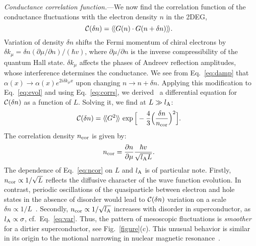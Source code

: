 \documentclass[reprint,
superscriptaddress,
amsmath,
amssymb,
aps,
prl,
floatfix,
english
]{revtex4-2}
\newcommand{\lprox}{L}
\newcommand{\lA}{l_{\rm A}}
\newcommand{\rngl}{\rangle\hspace{-0.05cm}\rangle}
\newcommand{\lngl}{\langle\hspace{-0.05cm}\langle}
\begin{document}
\textit{Conductance correlation function.}---We now find the correlation function of the conductance fluctuations with the electron density $n$ in the 2DEG,
\begin{equation}\label{eq:corrdef}
    {\cal C}(\delta n) = \lngl G(n) \cdot G(n + \delta n)\rngl.
\end{equation}
Variation of density $\delta n$ shifts the Fermi momentum of chiral electrons by $\delta k_\mu = \delta n (\partial \mu / \partial n) / (\hbar v)$, where $\partial \mu / \partial n$ is the inverse compressibility of the quantum Hall state.
$\delta k_\mu$ affects the phases of Andreev reflection amplitudes, whose interference determines the conductance.
We see from Eq.~\eqref{eq:damp} that $\alpha(x) \rightarrow \alpha(x) e^{2i\delta k_\mu x}$ upon changing $n \rightarrow n + \delta n$.
Applying this modification to Eq.~\eqref{eq:evol} and using Eq.~\eqref{eq:corrs}, we derived~\cite{sm} a differential equation for ${\cal C}(\delta n)$ as a function of $L$. Solving it, we find at $\lprox \gg \lA$: 
\begin{equation}\label{eq:corrf}
    {\cal C}(\delta n) = \lngl G^2 \rngl\, \exp \Big[-\frac{4}{3}\Big(\frac{\delta n}{n_{\rm cor}}\Big)^2\Big].
\end{equation}
The correlation density $n_{\rm cor}$ is given by:
\begin{equation}\label{eq:ncor}
    n_{\rm cor} = \frac{\partial n}{\partial \mu} \frac{\hbar v}{\sqrt{\lA \lprox}}.
\end{equation}
The dependence of Eq.~\eqref{eq:ncor} on $\lprox$ and $\lA$ is of particular note.
Firstly, $n_{\rm cor} \propto 1/\sqrt{L}$ reflects the diffusive character of the wave function evolution.
In contrast, periodic oscillations of the quasiparticle between electron and hole states in the absence of disorder would lead to ${\cal C}(\delta n)$ variation on a scale $\delta n \propto 1/L$~\cite{lian2016}. Secondly, $n_{\rm cor} \propto 1 / \sqrt{\lA}$ increases with disorder in superconductor, as $l_{\rm A} \propto \sigma$, cf.~Eq.~\eqref{eq:var}. 
Thus, the pattern of mesoscopic fluctuations is \textit{smoother} for a dirtier superconductor, see Fig.~\ref{figure}(c). 
This unusual behavior is similar in its origin to the motional narrowing in nuclear magnetic resonance~\cite{slichter1990}.
\end{document}
